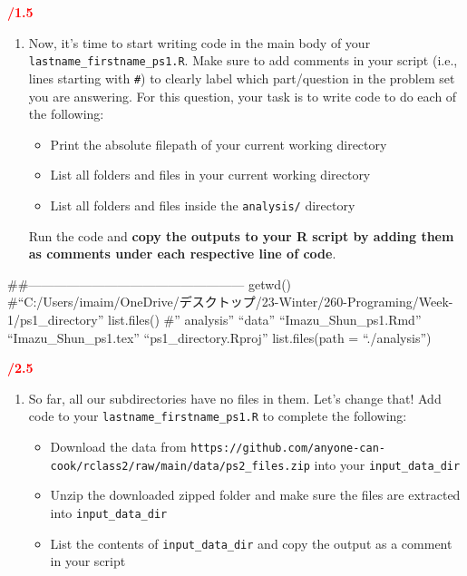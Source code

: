 \documentclass[
]{article}
\providecommand{\tightlist}{%
  \setlength{\itemsep}{0pt}\setlength{\parskip}{0pt}}
\begin{document}
\textcolor{red}{\textbf{/1.5}}

\begin{enumerate}
\def\labelenumi{\arabic{enumi}.}
\item
  Now, it's time to start writing code in the main body of your
  \texttt{lastname\_firstname\_ps1.R}. Make sure to add comments in your
  script (i.e., lines starting with \texttt{\#}) to clearly label which
  part/question in the problem set you are answering. For this question,
  your task is to write code to do each of the following:

  \begin{itemize}
  \tightlist
  \item
    Print the absolute filepath of your current working directory
  \item
    List all folders and files in your current working directory
  \item
    List all folders and files inside the \texttt{analysis/} directory
  \end{itemize}

  Run the code and \textbf{copy the outputs to your R script by adding
  them as comments under each respective line of code}.
\end{enumerate}

\#\#--------------------------------------------------- getwd()
\#``C:/Users/imaim/OneDrive/デスクトップ/23-Winter/260-Programing/Week-1/ps1\_directory''
list.files() \#'' analysis'' ``data'' ``Imazu\_Shun\_ps1.Rmd''
``Imazu\_Shun\_ps1.tex'' ``ps1\_directory.Rproj'' list.files(path =
``./analysis'')

\textcolor{red}{\textbf{/2.5 }}

\begin{enumerate}
\def\labelenumi{\arabic{enumi}.}
\setcounter{enumi}{1}
\item
  So far, all our subdirectories have no files in them. Let's change
  that! Add code to your \texttt{lastname\_firstname\_ps1.R} to complete
  the following:

  \begin{itemize}
  \tightlist
  \item
    Download the data from
    \texttt{https://github.com/anyone-can-cook/rclass2/raw/main/data/ps2\_files.zip}
    into your \texttt{input\_data\_dir}
  \item
    Unzip the downloaded zipped folder and make sure the files are
    extracted into \texttt{input\_data\_dir}
  \item
    List the contents of \texttt{input\_data\_dir} and copy the output
    as a comment in your script
  \end{itemize}
\end{enumerate}
\end{document}
